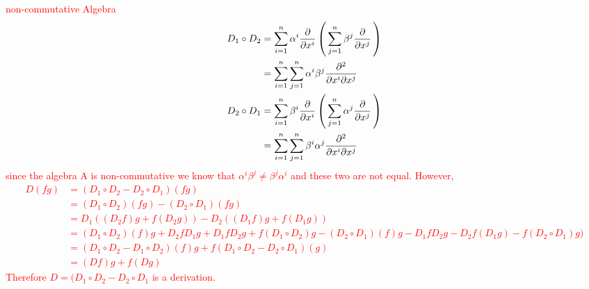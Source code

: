 \documentclass[10pt,a4paper]{report}
\newcommand{\RED}[1]{\textcolor{red}{#1}}
\begin{document}
\RED{non-commutative Algebra
\begin{align*}
	D_1 \circ D_2 &= \sum_{i=1}^n \alpha^i\frac{\partial }{\partial x^i} \left (\, \sum_{j=1}^n \beta^j \frac{\partial }{\partial x^j}  \,\right ) \\
	&= \sum_{i=1}^n\sum_{j=1}^n \alpha^i  \beta^j \frac{\partial ^2}{\partial x^i \partial x^j}  \\
	D_2 \circ D_1 &= \sum_{i=1}^n \beta^i\frac{\partial }{\partial x^i} \left (\, \sum_{j=1}^n \alpha^j \frac{\partial }{\partial x^j}  \,\right ) \\
	&= \sum_{i=1}^n\sum_{j=1}^n \beta^i  \alpha^j \frac{\partial ^2}{\partial x^i \partial x^j}  \\
\end{align*}since the algebra A is non-commutative we know that $\alpha^i\beta^j \ne \beta^j\alpha^i$ and these two are not equal.  However, 
\begin{align*}
	D(fg) &= (D_1 \circ D_2 - D_2 \circ D_1)(fg) \\
	&= (D_1 \circ D_2)(fg) - (D_2 \circ D_1)(fg) \\
	&= D_1((D_2f)g +f(D_2g)) - D_2((D_1f)g + f(D_1g)) \\
	&= (D_1\circ D_2)(f)g+D_2fD_1g +D_1fD_2g +f(D_1 \circ D_2)g - (D_2\circ D_1)(f)g - D_1fD_2g - D_2f(D_1g)- f(D_2 \circ D_1)g) \\
	&= (D_1 \circ D_2-D_1 \circ D_2)(f)g +  f(D_1 \circ D_2-D_2 \circ D_1)(g)\\
	&= (Df)g+f(Dg) 
\end{align*}Therefore $D = (D_1 \circ D_2 - D_2 \circ D_1$ is a derivation.
}
\end{document}
